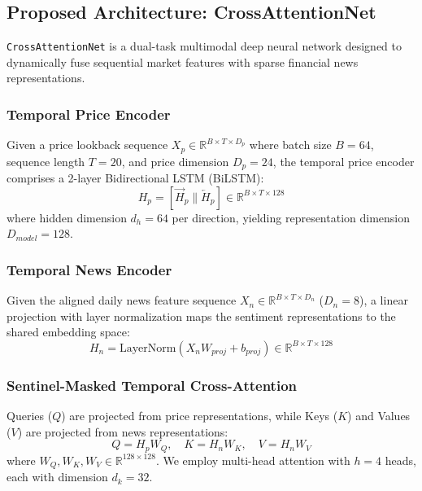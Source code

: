 \documentclass[10pt,journal,compsoc,twocolumn]{IEEEtran}
\begin{document}
\subsection{Proposed Architecture: CrossAttentionNet}
\texttt{CrossAttentionNet} is a dual-task multimodal deep neural network designed to dynamically fuse sequential market features with sparse financial news representations.

\subsubsection{Temporal Price Encoder}
Given a price lookback sequence $X_p \in \mathbb{R}^{B \times T \times D_p}$ where batch size $B=64$, sequence length $T=20$, and price dimension $D_p=24$, the temporal price encoder comprises a 2-layer Bidirectional LSTM (BiLSTM):
\begin{equation}
H_p = [ \vec{H}_p \parallel \overleftarrow{H}_p ] \in \mathbb{R}^{B \times T \times 128}
\end{equation}
where hidden dimension $d_h = 64$ per direction, yielding representation dimension $D_{model} = 128$.

\subsubsection{Temporal News Encoder}
Given the aligned daily news feature sequence $X_n \in \mathbb{R}^{B \times T \times D_n}$ ($D_n = 8$), a linear projection with layer normalization maps the sentiment representations to the shared embedding space:
\begin{equation}
H_n = \text{LayerNorm}(X_n W_{proj} + b_{proj}) \in \mathbb{R}^{B \times T \times 128}
\end{equation}

\subsubsection{Sentinel-Masked Temporal Cross-Attention}
Queries ($Q$) are projected from price representations, while Keys ($K$) and Values ($V$) are projected from news representations:
\begin{equation}
Q = H_p W_Q, \quad K = H_n W_K, \quad V = H_n W_V
\end{equation}
where $W_Q, W_K, W_V \in \mathbb{R}^{128 \times 128}$. We employ multi-head attention with $h=4$ heads, each with dimension $d_k = 32$.
\end{document}
